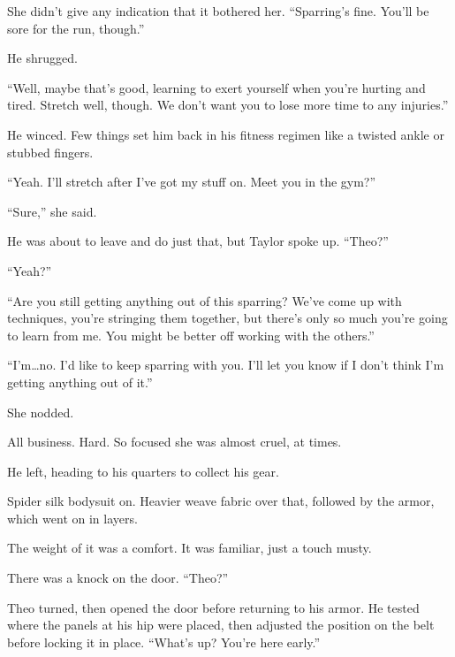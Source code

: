 She didn't give any indication that it bothered her.  ``Sparring's fine.  You'll be sore for the run, though.''



He shrugged.



``Well, maybe that's good, learning to exert yourself when you're hurting and tired.  Stretch well, though.  We don't want you to lose more time to any injuries.''



He winced.  Few things set him back in his fitness regimen like a twisted ankle or stubbed fingers.



``Yeah.  I'll stretch after I've got my stuff on.  Meet you in the gym?''



``Sure,'' she said.



He was about to leave and do just that, but Taylor spoke up.  ``Theo?''



``Yeah?''



``Are you still getting anything out of this sparring?  We've come up with techniques, you're stringing them together, but there's only so much you're going to learn from me.  You might be better off working with the others.''



``I'm\ldots no.  I'd like to keep sparring with you.  I'll let you know if I don't think I'm getting anything out of it.''



She nodded.



All business.  Hard.  So focused she was almost cruel, at times.



He left, heading to his quarters to collect his gear.



Spider silk bodysuit on.  Heavier weave fabric over that, followed by the armor, which went on in layers.



The weight of it was a comfort.  It was familiar, just a touch musty.



There was a knock on the door.  ``Theo?''



Theo turned, then opened the door before returning to his armor.  He tested where the panels at his hip were placed, then adjusted the position on the belt before locking it in place.  ``What's up?  You're here early.''



